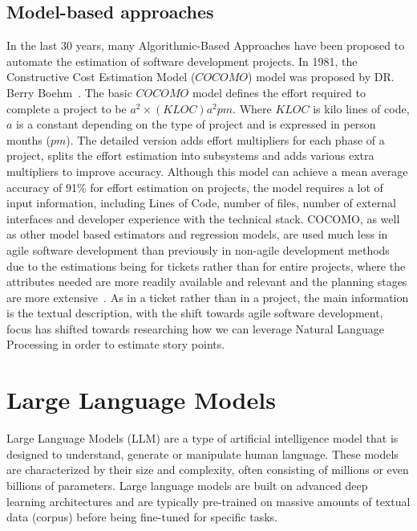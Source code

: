 \documentclass{UoYCSproject}
\begin{document}
    \subsection{Model-based approaches}\label{subsec:model-based-approaches}
    In the last 30 years, many Algorithmic-Based Approaches have been proposed to automate the estimation of software development projects.
    In 1981, the Constructive Cost Estimation Model ($COCOMO$) model was proposed by DR. Berry Boehm~\cite{Boehm2001}.
    The basic $COCOMO$ model defines the effort required to complete a project to be $a^2 \times (KLOC)a^2pm$.
    Where $KLOC$ is kilo lines of code, $a$ is a constant depending on the type of project and is expressed in person months ($pm$). The detailed version adds effort multipliers for each phase of a project, splits the effort estimation into subsystems and adds various extra multipliers to improve accuracy.
    Although this model can achieve a mean average accuracy of 91\% for effort estimation on projects, the model requires a lot of input information, including Lines of Code, number of files, number of external interfaces and developer experience with the technical stack.
    COCOMO, as well as other model based estimators and regression models, are used much less in agile software development than previously in non-agile development methods due to the estimations being for tickets rather than for entire projects, where the attributes needed are more readily available and relevant and the planning stages are more extensive~\cite{effortestimationsurvey}.
    As in a ticket rather than in a project, the main information is the textual description, with the shift towards agile software development, focus has shifted towards researching how we can leverage Natural Language Processing in order to estimate story points.




    \section{Large Language Models}
    \label{sec:large-language-models}
    Large Language Models (LLM) are a type of artificial intelligence model that is designed to understand, generate
    or manipulate human language.
    These models are characterized by their size and complexity, often consisting of millions or even billions of parameters.
    Large language models are built on advanced deep learning architectures and are typically pre-trained on massive amounts of textual data (corpus) before being fine-tuned for specific tasks. \par
\end{document}
